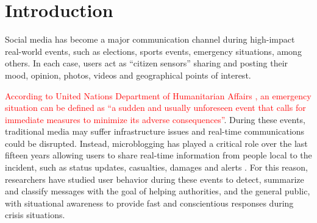 \documentclass[sigconf]{acmart}
\begin{document}




\maketitle

\section{Introduction}
Social media has become a major communication channel during high-impact real-world events, such as elections, sports events, emergency situations, among others. In each case, users act as ``citizen sensors'' sharing and posting their mood, opinion, photos, videos and geographical points of interest.

  \textcolor{red}{According to United Nations Department of Humanitarian Affairs \cite{dha1992internationally}, an emergency situation can be defined as ``a sudden and usually unforeseen event that calls for immediate measures to minimize its adverse consequences''}. During these events, traditional media may suffer infrastructure issues and real-time communications could be disrupted. Instead, microblogging has played a critical role over the last fifteen years allowing users to share real-time information from people local to the incident, such as status updates, casualties, damages and alerts \cite{kumar2011tweettracker,imran2013extracting,stowe2016identifying,reuterfifteen}. For this reason, researchers have studied user behavior during these events to detect, summarize and classify messages with the goal of helping authorities, and the general public, with situational awareness to provide fast and conscientious responses during crisis situations.
\end{document}
